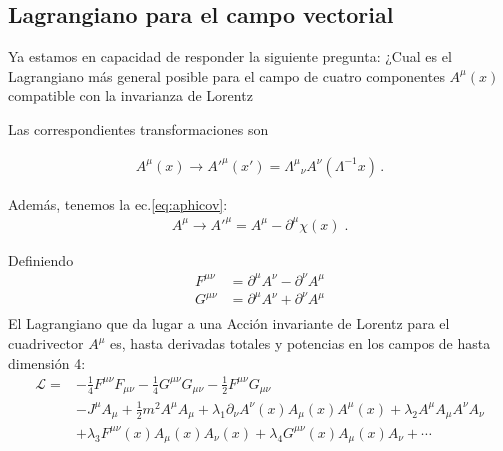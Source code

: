 \begin{subappendices}


\section{Lagrangiano para el campo vectorial}
\begin{frame}
Ya estamos en capacidad de responder la siguiente pregunta: ¿Cual es el Lagrangiano más general posible para el campo de cuatro componentes $A^{\mu}(x)$ compatible con la invarianza de Lorentz 

Las correspondientes transformaciones son

\begin{align}
  A^\mu(x)\to {A'}^\mu(x')={\Lambda^\mu}_\nu A^\nu(\Lambda^{-1}x)\,.
\end{align}

Además, tenemos la ec.\eqref{eq:aphicov}:
\begin{align}
\label{eq:172qft}
  A^\mu\to{A'}^\mu=A^\mu-\partial^\mu\chi(x)\;.
\end{align}




Definiendo
\begin{align*}
  F^{\mu\nu}&=\partial^\mu A^\nu-\partial^\nu A^\mu\\
  G^{\mu\nu}&=\partial^\mu A^\nu+\partial^\nu A^\mu\\
\end{align*}
El Lagrangiano que da lugar a una Acción invariante de Lorentz para el cuadrivector $A^\mu$
es, hasta derivadas totales y potencias en los campos de hasta dimensión 4:
\begin{align}
  \mathcal{L}=&-\frac{1}{4}F^{\mu\nu}F_{\mu\nu}-\frac{1}{4}G^{\mu\nu}G_{\mu\nu}-\frac{1}{2}F^{\mu\nu}G_{\mu\nu}\nonumber\\
&-J^\mu A_\mu+
 \frac{1}{2}m^2A^\mu A_\mu +\lambda_1\partial_\nu A^\nu(x) A_\mu(x) A^\mu(x)+\lambda_2 A^\mu A_\mu A^\nu A_\nu\nonumber\\
&+\lambda_3 F^{\mu\nu}(x)A_\mu(x) A_\nu(x)+\lambda_4G^{\mu\nu}(x)A_\mu(x) A_\nu+\cdots
  \label{eq:lagAmu}
\end{align}
\end{frame}


\end{subappendices}
